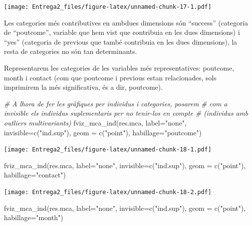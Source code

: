 \documentclass[
]{article}
\newenvironment{Shaded}{\begin{snugshade}}{\end{snugshade}}
\newcommand{\AttributeTok}[1]{\textcolor[rgb]{0.77,0.63,0.00}{#1}}
\newcommand{\CommentTok}[1]{\textcolor[rgb]{0.56,0.35,0.01}{\textit{#1}}}
\newcommand{\FunctionTok}[1]{\textcolor[rgb]{0.00,0.00,0.00}{#1}}
\newcommand{\NormalTok}[1]{#1}
\newcommand{\StringTok}[1]{\textcolor[rgb]{0.31,0.60,0.02}{#1}}
\begin{document}
\texttt{[image: Entrega2\_files/figure-latex/unnamed-chunk-17-1.pdf]}

Les categories més contributives en ambdues dimensions són ``success''
(categoria de ``poutcome'', variable que hem vist que contribuia en les
dues dimensions) i ``yes'' (categoria de previous que també contribuia
en les dues dimensions), la resta de categories no són tan determinants.

Representarem les categories de les variables més representatives:
poutcome, month i contact (com que poutcome i previous estan
relacionades, sols imprimirem la més significativa, és a dir, poutcome).

\begin{Shaded}
\begin{Highlighting}[]
\CommentTok{\# A l\textquotesingle{}hora de fer les gràfiques per individus i categories, posarem}
\CommentTok{\# com a invisible els individus suplementaris per no tenir{-}los en compte}
\CommentTok{\# (individus amb outliers multivariants)}
\FunctionTok{fviz\_mca\_ind}\NormalTok{(res.mca,}
             \AttributeTok{label=}\StringTok{"none"}\NormalTok{,}
             \AttributeTok{invisible=}\FunctionTok{c}\NormalTok{(}\StringTok{"ind.sup"}\NormalTok{),}
             \AttributeTok{geom =} \FunctionTok{c}\NormalTok{(}\StringTok{"point"}\NormalTok{),}
             \AttributeTok{habillage=}\StringTok{"poutcome"}\NormalTok{)}
\end{Highlighting}
\end{Shaded}

\texttt{[image: Entrega2\_files/figure-latex/unnamed-chunk-18-1.pdf]}

\begin{Shaded}
\begin{Highlighting}[]
\FunctionTok{fviz\_mca\_ind}\NormalTok{(res.mca,}
             \AttributeTok{label=}\StringTok{"none"}\NormalTok{,}
             \AttributeTok{invisible=}\FunctionTok{c}\NormalTok{(}\StringTok{"ind.sup"}\NormalTok{),}
             \AttributeTok{geom =} \FunctionTok{c}\NormalTok{(}\StringTok{"point"}\NormalTok{),}
             \AttributeTok{habillage=}\StringTok{"contact"}\NormalTok{)}
\end{Highlighting}
\end{Shaded}

\texttt{[image: Entrega2\_files/figure-latex/unnamed-chunk-18-2.pdf]}

\begin{Shaded}
\begin{Highlighting}[]
\FunctionTok{fviz\_mca\_ind}\NormalTok{(res.mca,}
             \AttributeTok{label=}\StringTok{"none"}\NormalTok{,}
             \AttributeTok{invisible=}\FunctionTok{c}\NormalTok{(}\StringTok{"ind.sup"}\NormalTok{),}
             \AttributeTok{geom =} \FunctionTok{c}\NormalTok{(}\StringTok{"point"}\NormalTok{),}
             \AttributeTok{habillage=}\StringTok{"month"}\NormalTok{)}
\end{Highlighting}
\end{Shaded}
\end{document}
